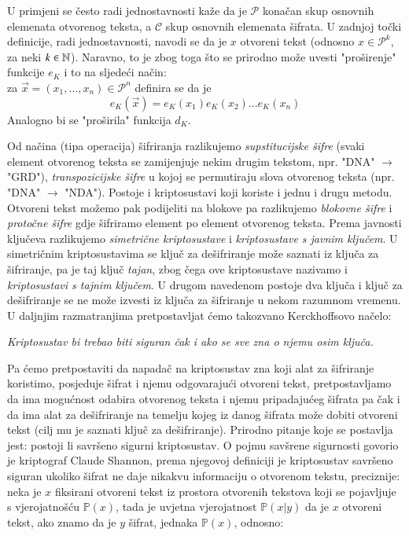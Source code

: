 \documentclass[a4paper,oneside,12pt]{memoir} %
\begin{document}
\begin{spacing}{1.5}
\begin{defn}
\begin{itemize}
\end{itemize}
\end{defn}
\begin{rem}
U primjeni se često radi jednostavnosti kaže da je $\mathcal{P}$ konačan skup osnovnih elemenata otvorenog teksta, a $\mathcal{C}$ skup osnovnih elemenata šifrata. U zadnjoj točki definicije, radi jednostavnosti, navodi se da je $x$ otvoreni tekst (odnosno $x \in \mathcal{P}^k$, za neki $k \in \mathbb{N}$). Naravno, to je zbog toga što se prirodno može uvesti "proširenje" funkcije $e_K$ i to na sljedeći način: \\ 
za $\vec{x}=(x_1,...,x_n) \in \mathcal{P}^n$ definira se da je \[e_K(\vec{x})=e_K(x_1)e_K(x_2)...e_K(x_n)\]
Analogno bi se "proširila" funkcija $d_K$. 
\end{rem}
Od načina (tipa operacija) šifriranja razlikujemo \textit{supstitucijske šifre} (svaki element otvorenog teksta se zamijenjuje nekim drugim tekstom, npr. "DNA" $\to$ "GRD"), \textit{transpozicijske šifre} u kojoj se permutiraju slova otvorenog teksta (npr. "DNA" $\to$ "NDA"). Postoje i kriptosustavi koji koriste i jednu i drugu metodu. Otvoreni tekst možemo pak podijeliti na blokove pa razlikujemo \textit{blokovne šifre} i  \textit{protočne šifre}	gdje šifriramo element po element otvorenog teksta. Prema javnosti ključeva razlikujemo \textit{simetrične kriptosustave} i \textit{kriptosustave s javnim ključem}. U simetričnim kriptosustavima se ključ za dešifriranje može saznati iz ključa za šifriranje, pa je taj ključ \textit{tajan}, zbog čega ove kriptosustave nazivamo i \textit{kriptosustavi s tajnim ključem}. U drugom navedenom postoje dva ključa i ključ za dešifriranje se ne može izvesti iz ključa za šifriranje u nekom razumnom vremenu. U daljnjim razmatranjima pretpostavljat ćemo takozvano Kerckhoffsovo načelo:
\begin{center}
	\textit{Kriptosustav bi trebao biti siguran čak i ako se sve zna o njemu osim ključa.}
\end{center}
Pa ćemo pretpostaviti da napadač na kriptosustav zna koji alat za šifriranje koristimo, posjeduje šifrat i njemu odgovarajući otvoreni tekst, pretpostavljamo da ima mogućnost odabira otvorenog teksta i njemu pripadajućeg šifrata pa čak i da ima alat za dešifriranje na temelju kojeg iz danog šifrata može dobiti otvoreni tekst (cilj mu je saznati ključ za dešifriranje). Prirodno pitanje koje se postavlja jest: postoji li savršeno sigurni kriptosustav. O pojmu savšrene sigurnosti govorio je kriptograf Claude Shannon, prema njegovoj definiciji je kriptosustav savršeno siguran ukoliko šifrat ne daje nikakvu informaciju o otvorenom tekstu, preciznije: neka je $x$ fiksirani otvoreni tekst iz prostora otvorenih tekstova koji se pojavljuje s vjerojatnošću $\mathbb{P}(x)$, tada je uvjetna vjerojatnost $\mathbb{P}(x|y)$ da je $x$ otvoreni tekst, ako znamo da je $y$ šifrat, jednaka $\mathbb{P}(x)$, odnosno:

\end{spacing}
\end{document}
